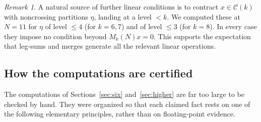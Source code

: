 \documentclass[11pt]{amsart}
\theoremstyle{definition}
\theoremstyle{remark}
\newtheorem{remark}[theorem]{Remark}
\theoremstyle{plain}
\numberwithin{equation}{section}
\numberwithin{table}{section}
\begin{document}
\begin{remark}\label{rem:partners}
A natural source of further linear conditions is to contract $x\in\mathcal C(k)$ with noncrossing partitions $\eta$, landing at a level $<k$. We computed these at $N=11$ for $\eta$ of level $\le4$ (for $k=6,7$) and of level $\le3$ (for $k=8$). In every case they impose no condition beyond $M_k(N)x=0$. This supports the expectation that leg-sums and merges generate all the relevant linear operations.
\end{remark}

\subsection{How the computations are certified}\label{sec:certify}

The computations of Sections~\ref{sec:six} and~\ref{sec:higher} are far too large to be checked by hand. They were organized so that each claimed fact rests on one of the following elementary principles, rather than on floating-point evidence.
\end{document}
